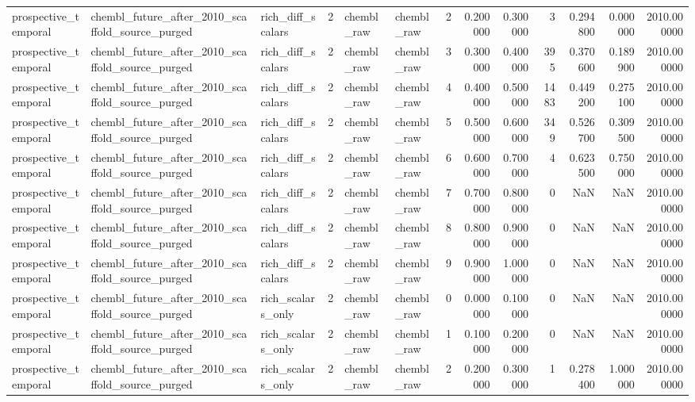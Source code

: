 \begin{longtable}{lllrllrrrrrrr}
prospective\_temporal & chembl\_future\_after\_2010\_scaffold\_source\_purged & rich\_diff\_scalars & 2 & chembl\_raw & chembl\_raw & 2 & 0.200000 & 0.300000 & 3 & 0.294800 & 0.000000 & 2010.000000 \\
prospective\_temporal & chembl\_future\_after\_2010\_scaffold\_source\_purged & rich\_diff\_scalars & 2 & chembl\_raw & chembl\_raw & 3 & 0.300000 & 0.400000 & 395 & 0.370600 & 0.189900 & 2010.000000 \\
prospective\_temporal & chembl\_future\_after\_2010\_scaffold\_source\_purged & rich\_diff\_scalars & 2 & chembl\_raw & chembl\_raw & 4 & 0.400000 & 0.500000 & 1483 & 0.449200 & 0.275100 & 2010.000000 \\
prospective\_temporal & chembl\_future\_after\_2010\_scaffold\_source\_purged & rich\_diff\_scalars & 2 & chembl\_raw & chembl\_raw & 5 & 0.500000 & 0.600000 & 349 & 0.526700 & 0.309500 & 2010.000000 \\
prospective\_temporal & chembl\_future\_after\_2010\_scaffold\_source\_purged & rich\_diff\_scalars & 2 & chembl\_raw & chembl\_raw & 6 & 0.600000 & 0.700000 & 4 & 0.623500 & 0.750000 & 2010.000000 \\
prospective\_temporal & chembl\_future\_after\_2010\_scaffold\_source\_purged & rich\_diff\_scalars & 2 & chembl\_raw & chembl\_raw & 7 & 0.700000 & 0.800000 & 0 & NaN & NaN & 2010.000000 \\
prospective\_temporal & chembl\_future\_after\_2010\_scaffold\_source\_purged & rich\_diff\_scalars & 2 & chembl\_raw & chembl\_raw & 8 & 0.800000 & 0.900000 & 0 & NaN & NaN & 2010.000000 \\
prospective\_temporal & chembl\_future\_after\_2010\_scaffold\_source\_purged & rich\_diff\_scalars & 2 & chembl\_raw & chembl\_raw & 9 & 0.900000 & 1.000000 & 0 & NaN & NaN & 2010.000000 \\
prospective\_temporal & chembl\_future\_after\_2010\_scaffold\_source\_purged & rich\_scalars\_only & 2 & chembl\_raw & chembl\_raw & 0 & 0.000000 & 0.100000 & 0 & NaN & NaN & 2010.000000 \\
prospective\_temporal & chembl\_future\_after\_2010\_scaffold\_source\_purged & rich\_scalars\_only & 2 & chembl\_raw & chembl\_raw & 1 & 0.100000 & 0.200000 & 0 & NaN & NaN & 2010.000000 \\
prospective\_temporal & chembl\_future\_after\_2010\_scaffold\_source\_purged & rich\_scalars\_only & 2 & chembl\_raw & chembl\_raw & 2 & 0.200000 & 0.300000 & 1 & 0.278400 & 1.000000 & 2010.000000 \\

\end{longtable}
